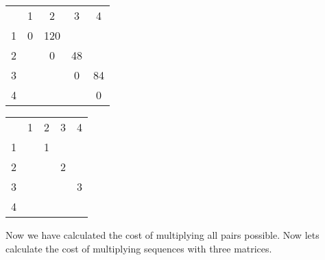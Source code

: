 \documentclass{article}
\begin{document}
\begin{center}
\label*{$m$}
\begin{tabular}{ c|c|c|c|c| }
    \multicolumn{1}{c}{}
    & \multicolumn{1}{c}{1}
    & \multicolumn{1}{c}{2}
    & \multicolumn{1}{c}{3}
    & \multicolumn{1}{c}{4}\\

    \cline{2-5}
        1 & 0 & 120 &  &  \\
    \cline{2-5}
        2 &  & 0 & 48 &  \\
    \cline{2-5}
        3 &  &  & 0 & 84 \\
    \cline{2-5}
        4 &  &  &  & 0 \\
    \cline{2-5}
\end{tabular}
\end{center}

\begin{center}
\label*{$s$}
\begin{tabular}{ c|c|c|c|c| }
    \multicolumn{1}{c}{}
    & \multicolumn{1}{c}{1}
    & \multicolumn{1}{c}{2}
    & \multicolumn{1}{c}{3}
    & \multicolumn{1}{c}{4}\\

    \cline{2-5}
        1 &  & 1 &  &  \\
    \cline{2-5}
        2 &  &  & 2 &  \\
    \cline{2-5}
        3 &  &  &  & 3 \\
    \cline{2-5}
        4 &  &  &  &  \\
    \cline{2-5}
\end{tabular}
\end{center}



Now we have calculated the cost of multiplying all pairs possible. Now lets calculate the cost of multiplying sequences with three matrices.
\end{document}
